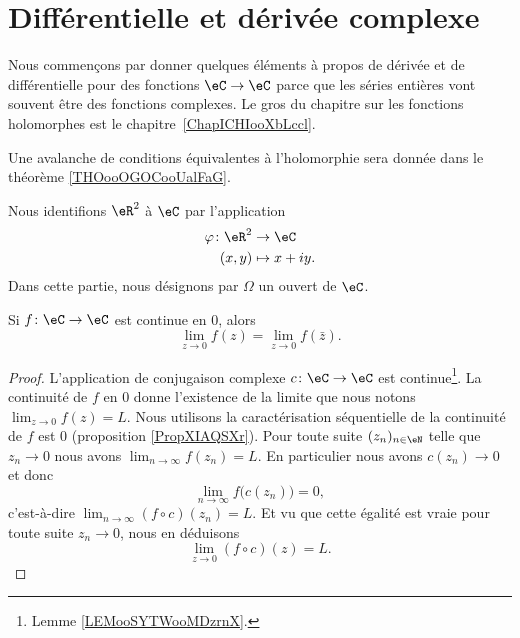 \section{Différentielle et dérivée complexe}
\label{SECooJWNOooOgMiWR}

\begin{normaltext}
	Nous commençons par donner quelques éléments à propos de dérivée et de différentielle pour des fonctions \( \eC\to \eC\) parce que les séries entières vont souvent être des fonctions complexes. Le gros du chapitre sur les fonctions holomorphes est le chapitre~\ref{ChapICHIooXbLccl}.
\end{normaltext}

Une avalanche de conditions équivalentes à l'holomorphie sera donnée dans le théorème \ref{THOooOGOCooUalFaG}.

Nous identifions \( \eR^2\) à \( \eC\) par l'application
\begin{equation}
	\begin{aligned}
		\varphi\colon \eR^2 & \to \eC       \\
		(x,y)               & \mapsto x+iy.
	\end{aligned}
\end{equation}
Dans cette partie, nous désignons par \( \Omega\) un ouvert de \( \eC\).

\begin{lemma}	\label{LEMooLFNVooUOCGMF}
	Si \(f \colon \eC\to \eC  \) est continue en \( 0\), alors
	\begin{equation}
		\lim_{z\to 0}f(z)=\lim_{z\to 0}f(\bar z).
	\end{equation}
\end{lemma}

\begin{proof}
	L'application de conjugaison complexe \(c \colon \eC\to \eC  \) est continue\footnote{Lemme \ref{LEMooSYTWooMDzrnX}.}. La continuité de \( f\) en \( 0\) donne l'existence de la limite que nous notons \( \lim_{z\to 0}f(z)=L\). Nous utilisons la caractérisation séquentielle de la continuité de \( f\) est \( 0\) (proposition \ref{PropXIAQSXr}). Pour toute suite \( (z_n)_{n\in \eN}\) telle que \( z_n\to 0\) nous avons \( \lim_{n\to \infty}f(z_n)=L\). En particulier nous avons \( c(z_n)\to 0\) et donc
	\begin{equation}
		\lim_{n\to \infty}f\big( c(z_n) \big)=0,
	\end{equation}
	c'est-à-dire \( \lim_{n\to \infty}(f\circ c)(z_n)=L\). Et vu que cette égalité est vraie pour toute suite \( z_n\to 0\), nous en déduisons
	\begin{equation}
		\lim_{z\to 0}(f\circ c)(z)=L.
	\end{equation}
\end{proof}




